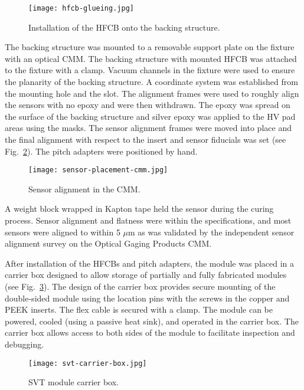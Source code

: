 \begin{figure}[hbt] 
\centering 
\texttt{[image: hfcb-glueing.jpg]}
\caption{Installation of the HFCB onto the backing structure.}
\label{fig:hfcb-glueing}
\end{figure}

The backing structure was mounted to a removable support plate on the fixture with an optical CMM. The backing structure with mounted HFCB was attached to the fixture with a clamp. Vacuum channels in the fixture were used to ensure the planarity of the backing structure. A coordinate system was established from the mounting hole and the slot. The alignment frames were used to roughly align the sensors with no epoxy and were then withdrawn. 
 The epoxy was spread on the surface of the backing structure and silver epoxy was applied to the HV pad areas using the masks. The sensor alignment frames were moved into place and the final alignment with respect to the insert and sensor fiducials was set (see Fig.~\ref{fig:sensor-placement-cmm}). The pitch adapters were positioned by hand. 
 
\begin{figure}[hbt] 
\centering 
\texttt{[image: sensor-placement-cmm.jpg]}
\caption{Sensor alignment in the CMM.}
\label{fig:sensor-placement-cmm}
\end{figure}

 A weight block wrapped in Kapton tape held the sensor during the curing process. Sensor alignment and flatness were within the specifications, and most sensors were aligned to within 5 $\mu$m as was validated by the independent sensor alignment survey on the Optical Gaging Products CMM.

After installation of the HFCBs and pitch adapters, the module was placed in a carrier box designed to allow storage of partially and fully fabricated modules (see Fig.~\ref{fig:svt-carrier-box}). The design of the carrier box provides secure mounting of the double-sided module using the location pins with the screws in the copper and PEEK inserts. The flex cable is secured with a clamp. The module can be powered, cooled (using a passive heat sink), and operated in the carrier box. The carrier box allows access to both sides of the module to facilitate inspection and debugging. 

\begin{figure}[hbt] 
\centering 
\texttt{[image: svt-carrier-box.jpg]}
\caption{SVT module carrier box.}
\label{fig:svt-carrier-box}
\end{figure}

